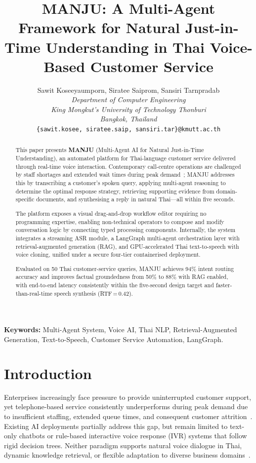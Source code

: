 \documentclass[10pt, a4paper, twocolumn]{article}
\title{\textbf{MANJU: A Multi-Agent Framework for Natural Just-in-Time Understanding in Thai Voice-Based Customer Service}}
\author{
    Sawit Koseeyaumporn, Siratee Saiprom, Sansiri Tarnpradab \\
    \textit{Department of Computer Engineering} \\
    \textit{King Mongkut's University of Technology Thonburi} \\
    \textit{Bangkok, Thailand} \\
    \texttt{\{sawit.kosee, siratee.saip, sansiri.tar\}@kmutt.ac.th}
}
\date{}
\begin{document}
\maketitle

\begin{abstract}
This paper presents \textbf{MANJU} (Multi-Agent AI for Natural
Just-in-Time Understanding), an automated platform for Thai-language
customer service delivered through real-time voice interaction.
Contemporary call-centre operations are challenged by staff shortages
and extended wait times during peak demand~\cite{gans2003callcenters};
MANJU addresses this by transcribing a customer's spoken query,
applying multi-agent reasoning to determine the optimal response
strategy, retrieving supporting evidence from domain-specific
documents, and synthesising a reply in natural Thai---all within
five seconds.

The platform exposes a visual drag-and-drop workflow editor requiring
no programming expertise, enabling non-technical operators to compose
and modify conversation logic by connecting typed processing
components. Internally, the system integrates a streaming ASR module,
a LangGraph multi-agent orchestration layer with retrieval-augmented
generation (RAG), and GPU-accelerated Thai text-to-speech with voice
cloning, unified under a secure four-tier containerised deployment.

Evaluated on 50 Thai customer-service queries, MANJU achieves 94\%
intent routing accuracy and improves factual groundedness from 50\%
to 88\% with RAG enabled, with end-to-end latency consistently within
the five-second design target and faster-than-real-time speech
synthesis (RTF\,=\,0.42).
\end{abstract}

\vspace{0.5em}
\noindent\textbf{Keywords:} Multi-Agent System, Voice AI, Thai NLP,
Retrieval-Augmented Generation, Text-to-Speech, Customer Service
Automation, LangGraph.

\section{Introduction}

Enterprises increasingly face pressure to provide uninterrupted customer
support, yet telephone-based service consistently underperforms during
peak demand due to insufficient staffing, extended queue times, and
consequent customer attrition~\cite{gans2003callcenters}.
Existing AI deployments partially address this gap, but remain limited to
text-only chatbots or rule-based interactive voice response (IVR) systems
that follow rigid decision trees.
Neither paradigm supports natural voice dialogue in Thai, dynamic knowledge
retrieval, or flexible adaptation to diverse business
domains~\cite{manjuProgReport}.
\end{document}
